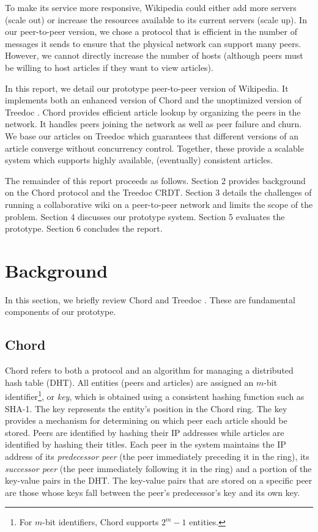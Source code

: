 \documentclass[twocolumn]{article}
\begin{document}
To make its service more responsive, Wikipedia could either add more servers (scale out) or increase the resources available to its current servers (scale up). In our peer-to-peer version, we chose a protocol that is efficient in the number of messages it sends to ensure that the physical network can support many peers. However, we cannot directly increase the number of hosts (although peers must be willing to host articles if they want to view articles).

In this report, we detail our prototype peer-to-peer version of Wikipedia. It implements both an enhanced version of Chord \cite{c1} and the unoptimized version of Treedoc \cite{t1,t2}. Chord provides efficient article lookup by organizing the peers in the network. It handles peers joining the network as well as peer failure and churn. We base our articles on Treedoc which guarantees that different versions of an article converge without concurrency control. Together, these provide a scalable system which supports highly available, (eventually) consistent articles.

The remainder of this report proceeds as follows. Section 2 provides background on the Chord protocol and the Treedoc CRDT. Section 3 details the challenges of running a collaborative wiki on a peer-to-peer network and limits the scope of the problem. Section 4 discusses our prototype system. Section 5 evaluates the prototype. Section 6 concludes the report.

\section{Background}
In this section, we briefly review Chord \cite{c1} and Treedoc \cite{t1}. These are fundamental components of our prototype.

\subsection{Chord}
Chord refers to both a protocol and an algorithm for managing a distributed hash table (DHT). All entities (peers and articles) are assigned an $m$-bit identifier\footnote{For $m$-bit identifiers, Chord supports $2^m-1$ entities.}, or \textit{key}, which is obtained using a consistent hashing function such as SHA-1. The key represents the entity's position in the Chord ring. The key provides a mechanism for determining on which peer each article should be stored. Peers are identified by hashing their IP addresses while articles are identified by hashing their titles. Each peer in the system maintains the IP address of its \textit{predecessor peer} (the peer immediately preceding it in the ring), its \textit{successor peer} (the peer immediately following it in the ring) and a portion of the key-value pairs in the DHT. The key-value pairs that are stored on a specific peer are those whose keys fall between the peer's predecessor's key and its own key.
\end{document}
